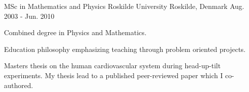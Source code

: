 \begin{cventries}
\cventry
{MSc in Mathematics and Physics} %
{Roskilde University}
{Roskilde, Denmark} %
{Aug. 2003 - Jun. 2010} %
{ %
\begin{cvitems}
\item {Combined degree in Physics and Mathematics.}
\item {Education philosophy emphasizing teaching through problem oriented projects.}
\item Masters thesis on the human cardiovascular system during head-up-tilt experiments. My thesis lead to a published peer-reviewed paper which I co-authored.
\end{cvitems}
}


\end{cventries}
